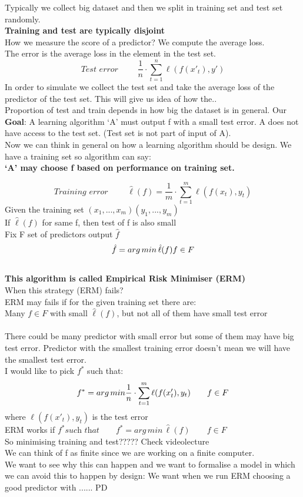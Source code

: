 \documentclass[../main.tex]{subfiles}
\begin{document}
Typically we collect big dataset and then we split in training set and test set
randomly.\\
\textbf{Training and test are typically disjoint}
\\
How we measure the score of a predictor? We compute the average loss.\\
The error is the average loss in the element in the test set.\\
$$
\textit{Test error }\qquad \frac{1}{n}\cdot \sum_{t=1}^{n} \ell(f(x'_t),y')
$$
In order to simulate we collect the test set and take the average loss of the predictor of the test set. This will give us idea of how the.. \\
Proportion of test and train depends in how big the dataset is in general.
Our \textbf{Goal}: A learning algorithm ‘A’ must output f with a small test error.
A does not have access to the test set. (Test set is not part of input of A).\\
Now we can think in general on how a learning algorithm should be design.
We have a training set so algorithm can say:\\
\textbf{‘A’ may choose f based on performance on training set.}

$$
\textit{Training error }\qquad \hat{\ell}(f) = \frac{1}{m}\cdot \sum_{t=1}^{m} \ell(f(x_t),y_t)
$$
Given the training set $(x_1,...,x_m) (y_1,...,y_m)$
\\
If $\hat{\ell}(f)$ for same f, then test of f is also small
\\
Fix F set of predictors output $\hat{f}$\\
$$ \hat{f} = arg\,min\, \hat{\ell}(f)\\ f \in F $$
\\
\textbf{This algorithm is called Empirical Risk Minimiser (ERM)}
\\
When this strategy (ERM) fails?\\
ERM may fails if for the given training set there are:\\
Many $f \in F$ with small $\hat{\ell}(f)$, but not all of them have small test error
\\\\
There could be many predictor with small error but some of them may have big test error. Predictor with the smallest training error doesn’t mean we will
have the smallest test error.\\
I would like to pick $f^*$ such that:
$$ f^* = arg\,min \frac{1}{n} \cdot \sum_{t=1}^{m} \ell(f(x'_t),y_t) \\ \qquad f \in F $$
where $\ell(f(x'_t),y_t)$ is the test error
\\
ERM works if $f^* \textit{such that} \qquad f^* = arg\,min\, \hat{\ell}(f)\qquad f \in F$
\\
So minimising training and test????? Check videolecture\\
We can think of f as finite since we are working on a finite computer.\\
We want to see why this can happen and we want to formalise a model in
which we can avoid this to happen by design:
We want when we run ERM choosing a good predictor with ...... PD\\\\
\end{document}
